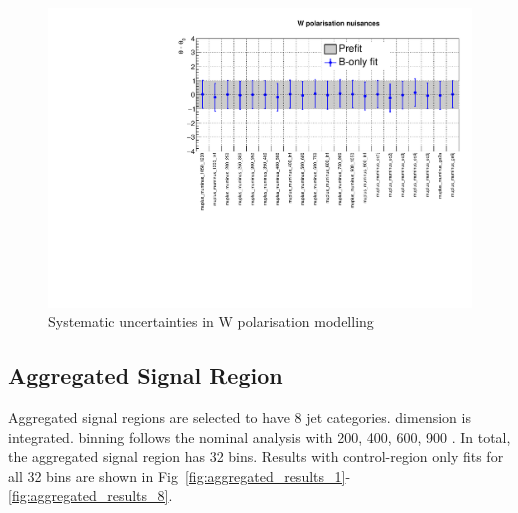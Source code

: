 \clearpage
\begin{figure}[h!]
  \centering
  \caption{Systematic uncertainties in W polarisation modelling}
  \includegraphics[width=0.8\linewidth]{figures/results/36invfb_preapproval/postfit/nuis/WPol_nuisances}
\end{figure}

\subsection{Aggregated Signal Region}
\label{app:aggregated}
Aggregated signal regions are selected to have 8 jet categories. 
\scalht dimension is integrated. \HTmiss binning follows the nominal 
analysis with 200, 400, 600, 900 \gev. In total, the aggregated signal 
region has 32 bins. Results with control-region only fits for all 32 bins 
are shown in Fig~\ref{fig:aggregated_results_1}-\ref{fig:aggregated_results_8}.

